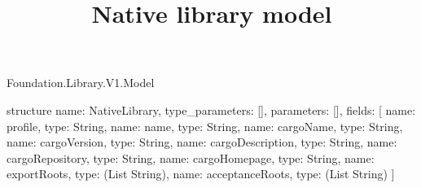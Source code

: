 \begin{lexlean}{Foundation.Library.V1.Model}
\title{Native library model}
\begin{semanticmodule}
structure{
  name: NativeLibrary,
  type_parameters: [],
  parameters: [],
  fields: [
    {name: profile, type: String},
    {name: name, type: String},
    {name: cargoName, type: String},
    {name: cargoVersion, type: String},
    {name: cargoDescription, type: String},
    {name: cargoRepository, type: String},
    {name: cargoHomepage, type: String},
    {name: exportRoots, type: (List String)},
    {name: acceptanceRoots, type: (List String)}
  ]
}
\end{semanticmodule}
\end{lexlean}
